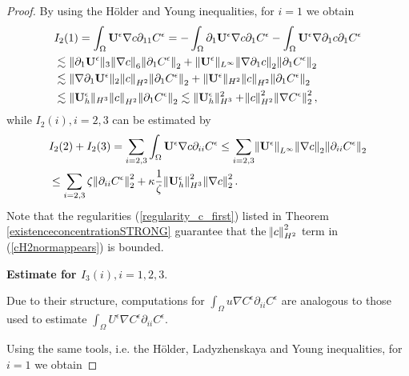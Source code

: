 \documentclass[11pt]{article}
\begin{document}
\begin{proof}
By using the H\"older and Young inequalities, for $i = 1$ we obtain
%
\begin{equation} \label{cH2normappears}
\begin{split}
& I_2(1) = \int_\Omega \mathbf{U}^\epsilon \nabla c \partial_{11} C^\epsilon = -\int_\Omega \partial_1 \mathbf{U}^\epsilon \nabla c \partial_1 C^\epsilon - \int_\Omega \mathbf{U}^\epsilon \nabla \partial_1 c \partial_1 C^\epsilon \\
& \lesssim \| \partial_1 \mathbf{U}^\epsilon \|_3 \norm{\nabla c}_6 \norm{\partial_1 C^\epsilon}_2 + \| \mathbf{U}^\epsilon \|_{L^\infty} \norm{\nabla \partial_1 c}_2 \norm{\partial_1 C^\epsilon}_2 \\
& \lesssim \| \nabla \partial_1 \mathbf{U}^\epsilon \|_2 \norm{c}_{H^2} \norm{\partial_1 C^\epsilon}_2 + \| \mathbf{U}^\epsilon \|_{H^2} \norm{c}_{H^2} \norm{\partial_1 C^\epsilon}_2 \\
& \lesssim \| \mathbf{U}_h^\epsilon \|_{H^3} \norm{c}_{H^2} \norm{\partial_1 C^\epsilon}_2 \lesssim \| \mathbf{U}_h^\epsilon \|_{H^3}^2 + \norm{c}_{H^2}^2 \norm{\nabla C^\epsilon}_2^2,
\end{split}
\end{equation}
%
while $I_2(i), i = 2,3$ can be estimated by
%
\begin{equation}
\begin{split}
& I_2(2) + I_2(3) = \sum_{i=2,3} \int_\Omega \mathbf{U}^\epsilon \nabla c \partial_{ii} C^\epsilon \leq \sum_{i=2,3} \norm{\mathbf{U}^\epsilon}_{L^\infty} \norm{\nabla c}_2 \norm{\partial_{ii} C^\epsilon}_2 \\
& \leq \sum_{i=2,3} \zeta \norm{\partial_{ii} C^\epsilon}_2^2 + \kappa \frac{1}{\zeta} \norm{\mathbf{U}_h^\epsilon}_{H^3}^2 \norm{\nabla c}_2^2.
\end{split}
\end{equation}
%
Note that the regularities (\ref{regularity_c_first}) listed in Theorem \ref{existenceconcentrationSTRONG} guarantee that the $\norm{c}_{H^2}^2$ term in (\ref{cH2normappears}) is bounded.

\bigskip

\textbf{Estimate for $I_3(i), i=1,2,3.$}

Due to their structure, computations for $\int_\Omega u \nabla C^\epsilon \partial_{ii} C^\epsilon$ are analogous to those used to estimate $ \int_\Omega U^\epsilon \nabla C^\epsilon \partial_{ii} C^\epsilon.$

Using the same tools, i.e. the H\"older, Ladyzhenskaya and Young inequalities, for $i=1$ we obtain


\end{proof}
\end{document}
